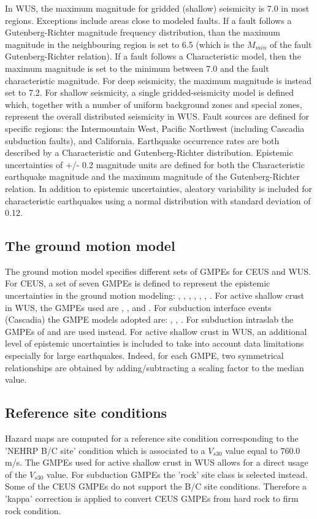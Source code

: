 In WUS, the maximum magnitude for gridded (shallow) seismicity is 7.0 in most regions. Exceptions include areas close to modeled faults. If a fault follows a Gutenberg-Richter magnitude frequency distribution, than the maximum magnitude in the neighbouring region is set to 6.5 (which is the $M_{min}$ of the fault Gutenberg-Richter relation). If a fault follows a Characteristic model, then the maximum magnitude is set to the minimum between 7.0 and the fault characteristic magnitude. For deep seismicity, the maximum magnitude is instead set to 7.2. For shallow seismicity, a single gridded-seismicity model is defined which, together with a number of uniform background zones and special zones, represent the overall distributed seismicity in WUS. Fault sources are defined for specific regions: the Intermountain West, Pacific Northwest (including Cascadia subduction faults), and California. Earthquake occurrence rates are both described by a Characteristic and Gutenberg-Richter distribution. Epistemic uncertainties of +/- 0.2 magnitude units are defined for both the Characteristic earthquake magnitude and the maximum magnitude of the Gutenberg-Richter relation. In addition to epistemic uncertainties, aleatory variability is included for characteristic earthquakes using a normal distribution with standard deviation of 0.12.

\subsection{The ground motion model}
The ground motion model specifies different sets of GMPEs for CEUS and WUS. For CEUS, a set of seven GMPEs is defined to represent the epistemic uncertainties in the ground motion modeling: \cite{frankel1996}, \cite{somerville2001}, \cite{campbell2003SCR}, \cite{toro1997}, \cite{atkinson2006}, \cite{tavakoli2005}, \cite{silva2002}. For active shallow crust in WUS, the GMPEs used are \cite{boore2008}, \cite{campbell2008}, and \cite{chiou2008}. For subduction interface events (Cascadia) the GMPE models adopted are: \cite{y1997}, \cite{ab2003}, \cite{zhao2006}. For subduction intraslab the GMPEs of \cite{geomatrix1993} and \cite{ab2003} are used instead. For active shallow crust in WUS, an additional level of epistemic uncertainties is included to take into account data limitations especially for large earthquakes. Indeed, for each GMPE, two symmetrical relationships are obtained by adding/subtracting a scaling factor to the median value.

\subsection{Reference site conditions}
Hazard maps are computed for a reference site condition corresponding to the 'NEHRP B/C site' condition which is associated to a $V_{s30}$ value equal to 760.0 m/s. The GMPEs used for active shallow crust in WUS allows for a direct usage of the $V_{s30}$ value. For subduction GMPEs the 'rock' site class is selected instead. Some of the CEUS GMPEs do not support the B/C site conditions. Therefore a 'kappa' correction is applied to convert CEUS GMPEs from hard rock to firm rock condition.

